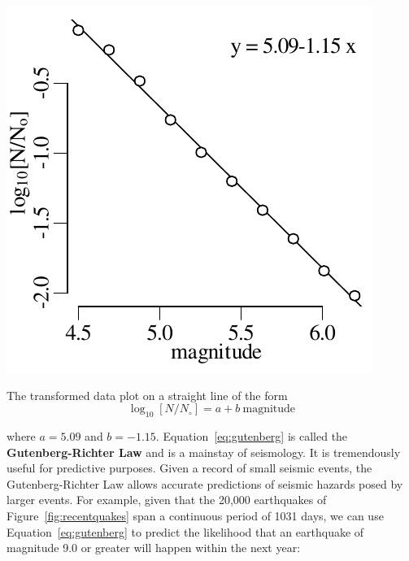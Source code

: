 \noindent\begin{minipage}[t][][b]{.3\textwidth}
  \includegraphics[width=\textwidth]{../figures/gutenberg.pdf}\medskip
\end{minipage}
\begin{minipage}[t][][t]{.7\textwidth}
  \label{fig:gutenberg}
\end{minipage}

The transformed data plot on a straight line of the form
\begin{equation}
  \log_{10}[N/N_\circ] = a + b~\mbox{magnitude}
  \label{eq:gutenberg}
\end{equation}

\noindent where $a = 5.09$ and $b =
-1.15$. Equation~\ref{eq:gutenberg} is called the
\textbf{Gutenberg-Richter Law} and is a mainstay of seismology. It is
tremendously useful for predictive purposes. Given a record of small
seismic events, the Gutenberg-Richter Law allows accurate predictions
of seismic hazards posed by larger events. For example, given that the
20,000 earthquakes of Figure~\ref{fig:recentquakes} span a continuous
period of 1031 days, we can use Equation~\ref{eq:gutenberg} to predict
the likelihood that an earthquake of magnitude 9.0 or greater will
happen within the next year:

